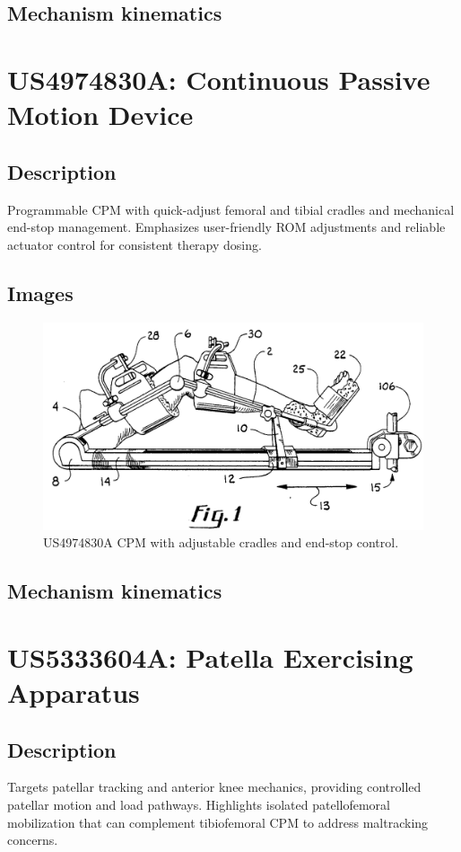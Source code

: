 \documentclass[11pt]{article}
\begin{document}
\subsection{Mechanism kinematics}

\section{US4974830A: Continuous Passive Motion Device}
\subsection{Description}
Programmable CPM with quick-adjust femoral and tibial cradles and mechanical end-stop management. Emphasizes user-friendly ROM adjustments and reliable actuator control for consistent therapy dosing.
\subsection{Images}
\begin{figure}[H]
  \centering
  \includegraphics[width=0.54\linewidth]{US4974830_1.png}
  \caption{US4974830A CPM with adjustable cradles and end-stop control.}
  \label{fig:US4974830A}
\end{figure}

\subsection{Mechanism kinematics}

\section{US5333604A: Patella Exercising Apparatus}
\subsection{Description}
Targets patellar tracking and anterior knee mechanics, providing controlled patellar motion and load pathways. Highlights isolated patellofemoral mobilization that can complement tibiofemoral CPM to address maltracking concerns.
\end{document}
